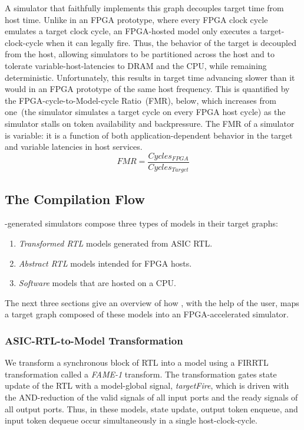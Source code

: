 A simulator that faithfully implements this graph decouples target time from
host time. Unlike in an FPGA prototype, where every FPGA clock cycle emulates a
target clock cycle, an FPGA-hosted model only executes a target-clock-cycle when
it can legally fire. Thus, the behavior of the target is decoupled from the
host, allowing simulators to be partitioned across the host and to tolerate
variable-host-latencies to DRAM and the CPU, while remaining deterministic.
Unfortunately, this results in target time advancing slower than it would in an
FPGA prototype of the same host frequency.  This is quantified by the
FPGA-cycle-to-Model-cycle Ratio~(FMR)\cite{APortNetworks}, below, which increases from
one~(the simulator simulates a target cycle on every FPGA host cycle) as the simulator stalls on token availability and backpressure. The FMR
of a simulator is variable: it is a function of both application-dependent
behavior in the target and variable latencies in host services.
$$ FMR = \frac{Cycles_{FPGA}}{Cycles_{Target}}$$

\subsection{The \SIMNAME Compilation Flow}\label{sec:fame1}
\SIMNAME-generated simulators compose three types of models in their target graphs:
\begin{enumerate}
    \item \emph{Transformed RTL} models generated from ASIC RTL.
    \item \emph{Abstract RTL} models intended for FPGA hosts.
    \item \emph{Software} models that are hosted on a CPU.
\end{enumerate}

The next three sections give an overview of how \SIMNAME, with the help of the
user, maps a target graph composed of these models into an FPGA-accelerated
simulator.

\subsubsection{ASIC-RTL-to-Model Transformation}\label{sec:fame1}
We transform a synchronous block of RTL into a model using a FIRRTL~\cite{FIRRTL} transformation called a \emph{FAME-1}
transform. The transformation gates state update of the RTL with a model-global
signal, \emph{targetFire}, which is driven with the AND-reduction of the valid
signals of all input ports and the ready signals of all output ports.  Thus, in
these models, state update, output token enqueue, and input token dequeue occur
simultaneously in a single host-clock-cycle.

